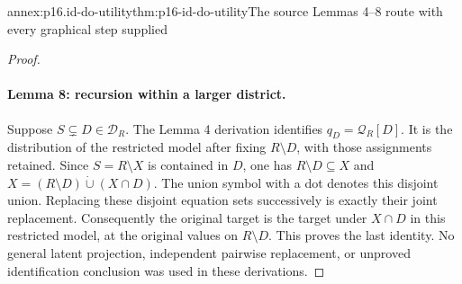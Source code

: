 \begin{annexitem}{annex:p16.id-do-utility}{thm:p16-id-do-utility}{The source Lemmas 4--8 route with every graphical step supplied}
\begin{proof}
\paragraph{Lemma 8: recursion within a larger district.}
Suppose \(S\subsetneq D\in\mathcal D_R\). The Lemma 4
derivation identifies \(q_D=\mathcal Q_R[D]\). It is the
distribution of the restricted model after fixing \(R\setminus D\),
with those assignments retained. Since \(S=R\setminus X\)
is contained in \(D\), one has
\(R\setminus D\subseteq X\) and
\(X=(R\setminus D)\mathbin{\dot\cup}(X\cap D)\).
The union symbol with a dot denotes this disjoint union. Replacing
these disjoint equation sets successively is exactly their joint
replacement. Consequently the original target is the target under
\(X\cap D\) in this restricted model, at the original values
on \(R\setminus D\). This proves the last identity. No general
latent projection, independent pairwise replacement, or unproved
identification conclusion was used in these derivations.
\end{proof}
\end{annexitem}

